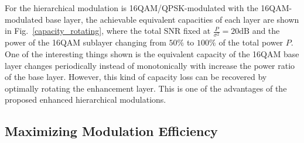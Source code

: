 \documentclass[conference]{IEEEtran}
\begin{document}
For the hierarchical modulation is 16QAM/QPSK-modulated with the
16QAM-modulated base layer, the achievable equivalent capacities
of each layer are shown in Fig.~\ref{capacity_rotating}, where the
total SNR fixed at $\frac{P}{\sigma^2}=20\mbox{dB}$ and the power
of the 16QAM sublayer changing from $50\%$ to $100\%$ of the total
power $P$. One of the interesting things shown is the equivalent
capacity of the 16QAM base layer changes periodically instead of
monotonically with increase the power ratio of the base layer.
However, this kind of capacity loss can be recovered by optimally
rotating the enhancement layer. This is one of the advantages of
the proposed enhanced hierarchical modulations.
\begin{figure}
\end{figure}

\subsection{Maximizing Modulation Efficiency}
\begin{figure} 
\end{figure}
\end{document}

